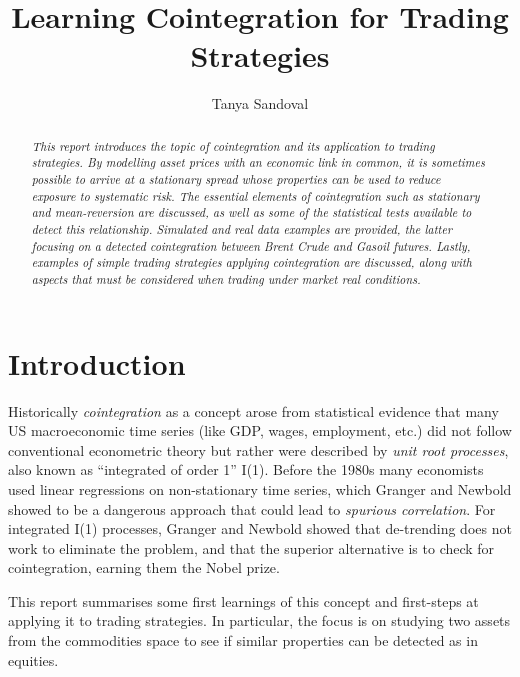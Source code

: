 \documentclass[11pt]{article}
\title{Learning Cointegration for Trading Strategies}
\author{Tanya Sandoval}
\begin{document}
    \maketitle

    \begin{abstract}
    \emph{This report introduces the topic of cointegration  and its application to trading strategies. 
    By modelling asset prices with an economic  link in common, it is sometimes possible to arrive at a stationary spread whose properties can be used to reduce exposure to systematic risk. The essential elements of cointegration such as stationary and mean-reversion are discussed, as well as some of the statistical tests available to detect this relationship. Simulated  and real data examples are provided, the latter focusing on a detected cointegration  between  Brent Crude and Gasoil futures. Lastly, examples of simple trading strategies applying cointegration are discussed, along with aspects that must be considered when trading under market real conditions. }
    \end{abstract}

    \newpage

    \tableofcontents
    \newpage


    \section{Introduction}\label{introduction}
    
    Historically  {\em cointegration} as a concept arose from statistical evidence that many US macroeconomic time series (like GDP, wages, employment, etc.) did not follow conventional econometric theory but rather were described by {\em unit root processes}, also known as  ``integrated of order 1'' I(1). Before the 1980s many economists used linear regressions on non-stationary time series, which Granger and Newbold showed to be a dangerous approach that could lead to  {\em spurious correlation}. For integrated I(1) processes, Granger and Newbold showed that de-trending does not work to eliminate the problem, and that the superior alternative is to check for cointegration, earning them the Nobel prize. 
    
    This report summarises some first learnings of this concept and first-steps at applying it to trading strategies. In particular, the focus is on studying two assets from the commodities space to see if similar properties can be detected as in equities.
    
\end{document}

